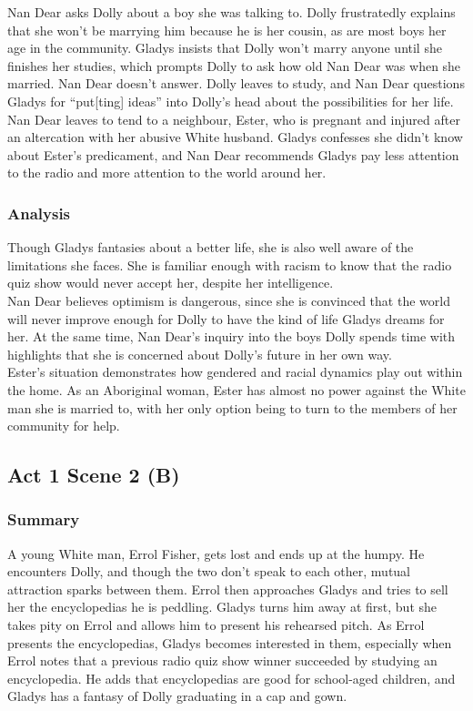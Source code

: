 \documentclass[a4paper]{article}
\begin{document}
Nan Dear asks Dolly about a boy she was talking to. Dolly
frustratedly explains that she won’t be marrying him because
he is her cousin, as are most boys her age in the community.
Gladys insists that Dolly won’t marry anyone until she finishes
her studies, which prompts Dolly to ask how old Nan Dear was
when she married. Nan Dear doesn’t answer. Dolly leaves to
study, and Nan Dear questions Gladys for “put[ting] ideas” into
Dolly’s head about the possibilities for her life.\\

Nan Dear leaves to tend to a neighbour, Ester, who is pregnant
and injured after an altercation with her abusive White
husband. Gladys confesses she didn’t know about Ester’s
predicament, and Nan Dear recommends Gladys pay less
attention to the radio and more attention to the world around
her.\\

\subsubsection{Analysis}
Though Gladys fantasies about a better life, she is also well aware
of the limitations she faces. She is familiar enough with racism to
know that the radio quiz show would never accept her, despite her
intelligence.\\

Nan Dear believes optimism is dangerous, since she is convinced
that the world will never improve enough for Dolly to have the kind
of life Gladys dreams for her. At the same time, Nan Dear’s inquiry
into the boys Dolly spends time with highlights that she is
concerned about Dolly’s future in her own way.\\

Ester’s situation demonstrates how gendered and racial dynamics
play out within the home. As an Aboriginal woman, Ester has
almost no power against the White man she is married to, with her
only option being to turn to the members of her community for help.\\

\subsection{Act 1 Scene 2 (B)}
\subsubsection{Summary}
A young White man, Errol Fisher, gets lost and ends up at the
humpy. He encounters Dolly, and though the two don’t speak
to each other, mutual attraction sparks between them. Errol
then approaches Gladys and tries to sell her the encyclopedias
he is peddling. Gladys turns him away at first, but she takes pity
on Errol and allows him to present his rehearsed pitch. As Errol
presents the encyclopedias, Gladys becomes interested in
them, especially when Errol notes that a previous radio quiz
show winner succeeded by studying an encyclopedia. He adds
that encyclopedias are good for school-aged children, and
Gladys has a fantasy of Dolly graduating in a cap and gown.\\
\end{document}
